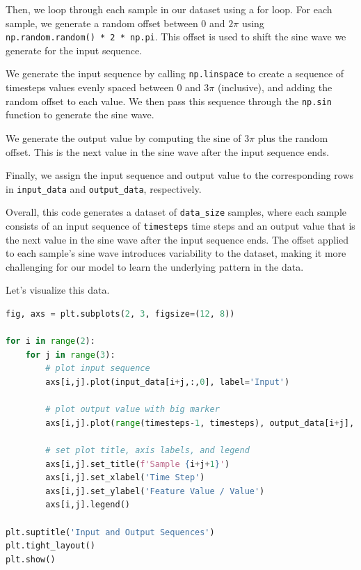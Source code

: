 Then, we loop through each sample in our dataset using a for loop. For
each sample, we generate a random offset between \(0\) and \(2 \pi\) using
\lstinline{np.random.random() * 2 * np.pi}. This offset is
used to shift the sine wave we generate for the input sequence. \newline

We generate the input sequence by calling
\lstinline{np.linspace} to create a sequence of timesteps
values evenly spaced between \(0\) and \(3 \pi\) (inclusive), and adding the random
offset to each value. We then pass this sequence through the
\lstinline{np.sin} function to generate the sine wave. \newline

We generate the output value by computing the sine of \(3 \pi\) plus the random
offset. This is the next value in the sine wave after the input sequence
ends. \newline

Finally, we assign the input sequence and output value to the
corresponding rows in \lstinline{input_data} and
\lstinline{output_data}, respectively. \newline

Overall, this code generates a dataset of
\lstinline{data_size} samples, where each sample consists
of an input sequence of \lstinline{timesteps} time steps
and an output value that is the next value in the sine wave after the
input sequence ends. The offset applied to each sample's sine wave
introduces variability to the dataset, making it more challenging for
our model to learn the underlying pattern in the data. \newline

Let's visualize this data.

\begin{lstlisting}[language=Python]
fig, axs = plt.subplots(2, 3, figsize=(12, 8))

for i in range(2):
    for j in range(3):
        # plot input sequence
        axs[i,j].plot(input_data[i+j,:,0], label='Input')

        # plot output value with big marker
        axs[i,j].plot(range(timesteps-1, timesteps), output_data[i+j], marker='o', markersize=10, label='Output')

        # set plot title, axis labels, and legend
        axs[i,j].set_title(f'Sample {i+j+1}')
        axs[i,j].set_xlabel('Time Step')
        axs[i,j].set_ylabel('Feature Value / Value')
        axs[i,j].legend()

plt.suptitle('Input and Output Sequences')
plt.tight_layout()
plt.show()
\end{lstlisting}

